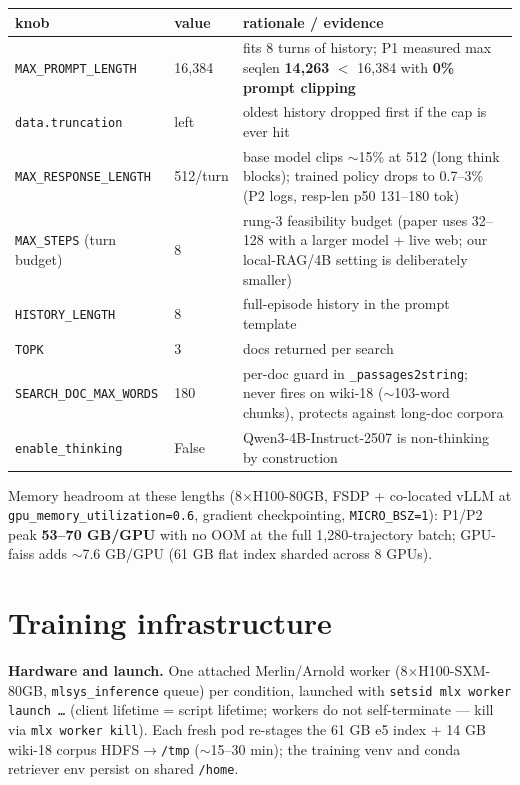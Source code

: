 \documentclass[10pt]{article}
\newcommand{\cmd}[1]{\texttt{\small #1}}
\begin{document}
\begin{center}\small
\begin{tabular}{@{}llp{8.2cm}@{}}
\toprule
knob & value & rationale / evidence \\
\midrule
\cmd{MAX\_PROMPT\_LENGTH} & 16{,}384 & fits 8 turns of history; P1 measured max seqlen
\textbf{14{,}263} $<$ 16{,}384 with \textbf{0\% prompt clipping} \\
\cmd{data.truncation} & left & oldest history dropped first if the cap is ever hit \\
\cmd{MAX\_RESPONSE\_LENGTH} & 512/turn & base model clips $\sim$15\% at 512 (long think blocks);
trained policy drops to 0.7--3\% (P2 logs, resp-len p50 131--180 tok) \\
\cmd{MAX\_STEPS} (turn budget) & 8 & rung-3 feasibility budget (paper uses 32--128 with a larger
model + live web; our local-RAG/4B setting is deliberately smaller) \\
\cmd{HISTORY\_LENGTH} & 8 & full-episode history in the prompt template \\
\cmd{TOPK} & 3 & docs returned per search \\
\cmd{SEARCH\_DOC\_MAX\_WORDS} & 180 & per-doc guard in \cmd{\_passages2string}; never fires on
wiki-18 ($\sim$103-word chunks), protects against long-doc corpora \\
\cmd{enable\_thinking} & False & Qwen3-4B-Instruct-2507 is non-thinking by construction \\
\bottomrule
\end{tabular}
\end{center}

Memory headroom at these lengths (8$\times$H100-80GB, FSDP + co-located vLLM at
\cmd{gpu\_memory\_utilization=0.6}, gradient checkpointing, \cmd{MICRO\_BSZ=1}): P1/P2 peak
\textbf{53--70 GB/GPU} with no OOM at the full 1{,}280-trajectory batch; GPU-faiss adds
$\sim$7.6 GB/GPU (61 GB flat index sharded across 8 GPUs).

\section{Training infrastructure}
\textbf{Hardware and launch.} One attached Merlin/Arnold worker (8$\times$H100-SXM-80GB,
\cmd{mlsys\_inference} queue) per condition, launched with \cmd{setsid mlx worker launch \dots}
(client lifetime = script lifetime; workers do not self-terminate --- kill via \cmd{mlx worker kill}).
Each fresh pod re-stages the 61 GB e5 index + 14 GB wiki-18 corpus HDFS$\to$\cmd{/tmp}
($\sim$15--30 min); the training venv and conda retriever env persist on shared \cmd{/home}.
\end{document}

